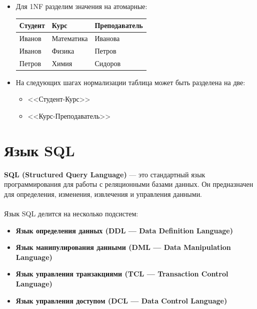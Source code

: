 \documentclass[a4paper, 12pt]{report}
\numberwithin{equation}{section}
\begin{document}
\begin{itemize}
	\item Для 1NF разделим значения на атомарные:
	\begin{center}
		\begin{tabular}{|l|l|l|}
			\hline
			\textbf{Студент} & \textbf{Курс} & \textbf{Преподаватель} \\
			\hline
			Иванов & Математика & Иванова \\
			Иванов & Физика & Петров \\
			Петров & Химия & Сидоров \\
			\hline
		\end{tabular}
	\end{center}
	\item На следующих шагах нормализации таблица может быть разделена на две:
	\begin{itemize}
		\item <<Студент-Курс>>
		\item <<Курс-Преподаватель>>
	\end{itemize}
\end{itemize}

\section{Язык SQL}
\textbf{SQL (Structured Query Language)} --- это стандартный язык программирования для работы с реляционными базами данных. Он предназначен для определения, изменения, извлечения и управления данными.
\\\\
Язык SQL делится на несколько подсистем:
\begin{itemize}
	\item \textbf{Язык определения данных (DDL --- Data Definition Language)}
	\item \textbf{Язык манипулирования данными (DML --- Data Manipulation Language)}
	\item \textbf{Язык управления транзакциями (TCL --- Transaction Control Language)}
	\item \textbf{Язык управления доступом (DCL --- Data Control Language)}
\end{itemize}
\end{document}
